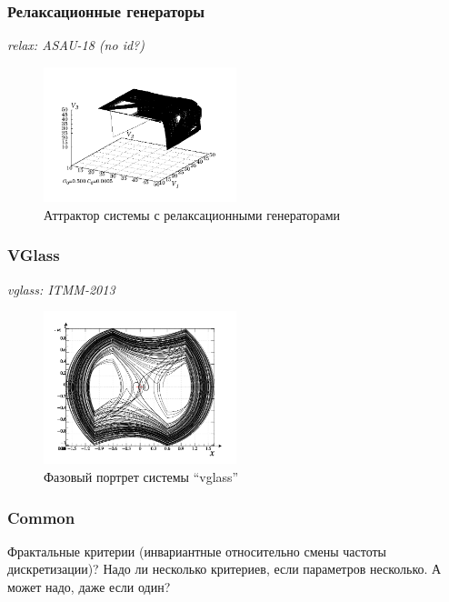 \documentclass[a4paper,12pt]{article}
\newcommand{\LinkRef}[1]{ \textit{#1} }
\begin{document}
\FloatBarrier
\subsubsection{Релаксационные генераторы}


\LinkRef{
  relax: ASAU-18 (no id?)
}

\begin{figure}[htb!]
\centerline{\includegraphics[width=0.5\textwidth]{p/cha/relax_phase3_0500.pdf} }
\caption{Аттрактор системы с релаксационными генераторами}
\label{atu:f:relax_phase3}
\end{figure}



\FloatBarrier
\subsubsection{VGlass} %

\LinkRef{
  vglass: ITMM-2013
}

\begin{figure}[htb!]
\centerline{\includegraphics[width=0.5\textwidth]{p/cha/vg1-graph_phase.png} }
\caption{Фазовый портрет системы ``vglass'' }
\label{atu:f:vglass_phase}
\end{figure}


\FloatBarrier
\subsubsection{Common}

Фрактальные критерии (инвариантные относительно смены частоты дискретизации)?
Надо ли несколько критериев, если параметров несколько.
А может надо, даже если один?
\end{document}
